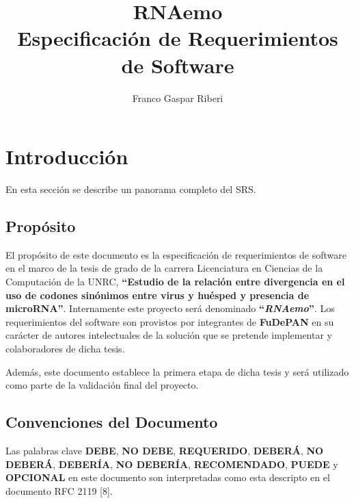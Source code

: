 \documentclass[12pt,a4paper,spanish]{article}
\title{\textbf{RNAemo}\\ \vspace{0.45cm} Especificación de Requerimientos de Software}
\author{Franco Gaspar Riberi}
\newcommand{\rnaemo}{\textbf{\emph{RNAemo}}}
\begin{document}
\maketitle\pagebreak{}\tableofcontents{}\pagebreak{}

\newpage

\section{Introducción}
En esta sección se describe un panorama completo del SRS.

\subsection{Propósito}
\par El propósito de este documento es la especificación de requerimientos
de software en el marco de la tesis de grado de la carrera Licenciatura en
Ciencias de la Computación de la UNRC, \textbf{``Estudio de la relación entre divergencia en el uso de codones 
sinónimos entre virus y huésped y presencia de microRNA''}. Internamente este proyecto será denominado \textbf{``}\rnaemo\textbf{''}.
Los requerimientos del software son provistos por integrantes de \textbf{FuDePAN} en su carácter de autores
intelectuales de la solución que se pretende implementar y colaboradores
de dicha tesis.
\par Además, este documento establece la primera etapa de dicha tesis y será utilizado
como parte de la validación final del proyecto.

\subsection{Convenciones del Documento}
Las palabras clave \textbf{DEBE}, \textbf{NO DEBE}, \textbf{REQUERIDO}, \textbf{DEBERÁ}, \textbf{NO DEBERÁ},
 \textbf{DEBERÍA}, \textbf{NO DEBERÍA}, \textbf{RECOMENDADO}, \textbf{PUEDE} y \textbf{OPCIONAL}
en este documento son interpretadas como esta descripto en el documento RFC
2119 [8]. 
\end{document}
